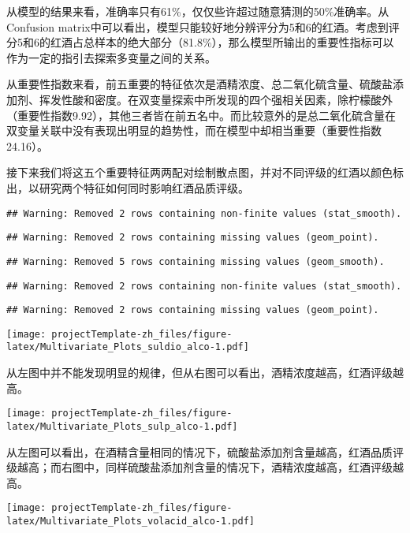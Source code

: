 \documentclass[]{article}
\begin{document}
从模型的结果来看，准确率只有61\%，仅仅些许超过随意猜测的50\%准确率。从Confusion
matrix中可以看出，模型只能较好地分辨评分为5和6的红酒。考虑到评分5和6的红酒占总样本的绝大部分（81.8\%），那么模型所输出的重要性指标可以作为一定的指引去探索多变量之间的关系。

从重要性指数来看，前五重要的特征依次是酒精浓度、总二氧化硫含量、硫酸盐添加剂、挥发性酸和密度。在双变量探索中所发现的四个强相关因素，除柠檬酸外（重要性指数9.92），其他三者皆在前五名中。而比较意外的是总二氧化硫含量在双变量关联中没有表现出明显的趋势性，而在模型中却相当重要（重要性指数24.16）。

接下来我们将这五个重要特征两两配对绘制散点图，并对不同评级的红酒以颜色标出，以研究两个特征如何同时影响红酒品质评级。

\begin{verbatim}
## Warning: Removed 2 rows containing non-finite values (stat_smooth).
\end{verbatim}

\begin{verbatim}
## Warning: Removed 2 rows containing missing values (geom_point).
\end{verbatim}

\begin{verbatim}
## Warning: Removed 5 rows containing missing values (geom_smooth).
\end{verbatim}

\begin{verbatim}
## Warning: Removed 2 rows containing non-finite values (stat_smooth).
\end{verbatim}

\begin{verbatim}
## Warning: Removed 2 rows containing missing values (geom_point).
\end{verbatim}

\texttt{[image: projectTemplate-zh\_files/figure-latex/Multivariate\_Plots\_suldio\_alco-1.pdf]}

从左图中并不能发现明显的规律，但从右图可以看出，酒精浓度越高，红酒评级越高。

\texttt{[image: projectTemplate-zh\_files/figure-latex/Multivariate\_Plots\_sulp\_alco-1.pdf]}

从左图可以看出，在酒精含量相同的情况下，硫酸盐添加剂含量越高，红酒品质评级越高；而右图中，同样硫酸盐添加剂含量的情况下，酒精浓度越高，红酒评级越高。

\texttt{[image: projectTemplate-zh\_files/figure-latex/Multivariate\_Plots\_volacid\_alco-1.pdf]}
\end{document}
